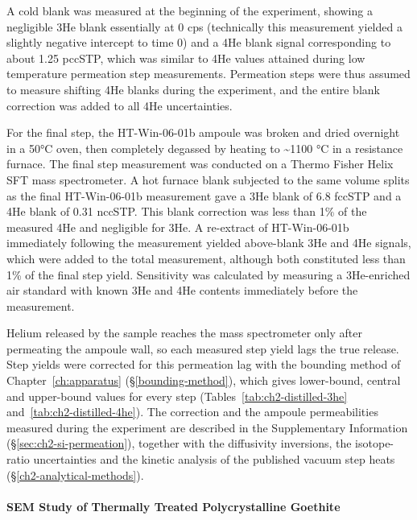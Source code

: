 A cold blank was measured at the beginning of the experiment, showing a
negligible 3He blank essentially at 0 cps (technically this measurement
yielded a slightly negative intercept to time 0) and a 4He blank signal
corresponding to about 1.25 pccSTP, which was similar to 4He values
attained during low temperature permeation step measurements. Permeation
steps were thus assumed to measure shifting 4He blanks during the
experiment, and the entire blank correction was added to all 4He
uncertainties.

For the final step, the HT-Win-06-01b ampoule was broken and dried
overnight in a 50°C oven, then completely degassed by heating to
\textasciitilde1100 °C in a resistance furnace. The final step
measurement was conducted on a Thermo Fisher Helix SFT mass spectrometer. A
hot furnace blank subjected to the same volume splits as the final
HT-Win-06-01b measurement gave a 3He blank of 6.8 fccSTP and a 4He blank
of 0.31 nccSTP. This blank correction was less than 1\% of the measured
4He and negligible for 3He. A re-extract of HT-Win-06-01b immediately
following the measurement yielded above-blank 3He and 4He signals, which
were added to the total measurement, although both constituted less than
1\% of the final step yield. Sensitivity was calculated by measuring a
3He-enriched air standard with known 3He and 4He contents immediately
before the measurement.

Helium released by the sample reaches the mass spectrometer only after permeating the ampoule
wall, so each measured step yield lags the true release. Step yields were corrected for this
permeation lag with the bounding method of Chapter~\ref{ch:apparatus} (\S\ref{bounding-method}),
which gives lower-bound, central and upper-bound values for every step
(Tables~\ref{tab:ch2-distilled-3he} and~\ref{tab:ch2-distilled-4he}). The correction and the
ampoule permeabilities measured during the experiment are described in the Supplementary
Information (\S\ref{sec:ch2-si-permeation}), together with the diffusivity inversions, the
isotope-ratio uncertainties and the kinetic analysis of the published vacuum step heats
(\S\ref{ch2-analytical-methods}).

\paragraph{SEM Study of Thermally Treated Polycrystalline
Goethite}\label{sem-study-of-thermally-treated-polycrystalline-goethite}\label{sec:gt_pigment_methods}

